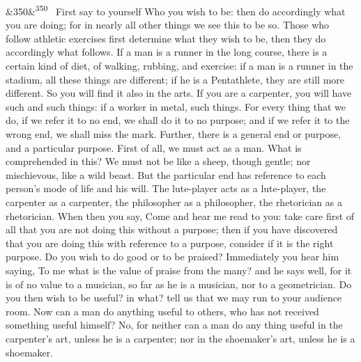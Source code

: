 \documentclass[12pt]{article}
\newcommand{\para}[1][]{\par\noindent\ifx&#1&\else\textsuperscript{\footnotesize #1}~\fi}
\begin{document}
\para[350] First say to yourself Who you wish to be: then do accordingly what you are doing; for in nearly all other things we see this to be so. Those who follow athletic exercises first determine what they wish to be, then they do accordingly what follows. If a man is a runner in the long course, there is a certain kind of diet, of walking, rubbing, and exercise: if a man is a runner in the stadium, all these things are different; if he is a Pentathlete, they are still more different. So you will find it also in the arts. If you are a carpenter, you will have such and such things: if a worker in metal, such things. For every thing that we do, if we refer it to no end, we shall do it to no purpose; and if we refer it to the wrong end, we shall miss the mark. Further, there is a general end or purpose, and a particular purpose. First of all, we must act as a man. What is comprehended in this? We must not be like a sheep, though gentle; nor mischievous, like a wild beast. But the particular end has reference to each person's mode of life and his will. The lute-player acts as a lute-player, the carpenter as a carpenter, the philosopher as a philosopher, the rhetorician as a rhetorician. When then you say, Come and hear me read to you: take care first of all that you are not doing this without a purpose; then if you have discovered that you are doing this with reference to a purpose, consider if it is the right purpose. Do you wish to do good or to be praised? Immediately you hear him saying, To me what is the value of praise from the many? and he says well, for it is of no value to a musician, so far as he is a musician, nor to a geometrician. Do you then wish to be useful? in what? tell us that we may run to your audience room. Now can a man do anything useful to others, who has not received something useful himself? No, for neither can a man do any thing useful in the carpenter's art, unless he is a carpenter; nor in the shoemaker's art, unless he is a shoemaker.
\end{document}
